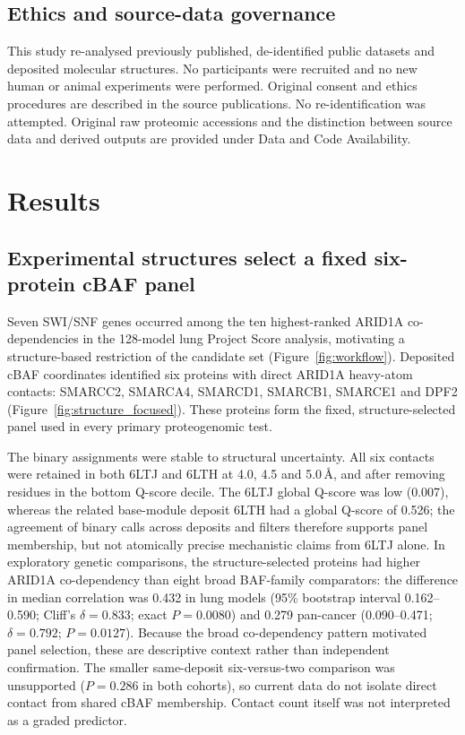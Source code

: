 \documentclass[journal=jprobs,manuscript=article,layout=traditional]{achemso}
\begin{document}
\subsection{Ethics and source-data governance}
This study re-analysed previously published, de-identified public datasets and deposited molecular structures. No participants were recruited and no new human or animal experiments were performed. Original consent and ethics procedures are described in the source publications. No re-identification was attempted. Original raw proteomic accessions and the distinction between source data and derived outputs are provided under Data and Code Availability.

\section{Results}

\subsection{Experimental structures select a fixed six-protein cBAF panel}

Seven SWI/SNF genes occurred among the ten highest-ranked ARID1A co-dependencies in the 128-model lung Project Score analysis, motivating a structure-based restriction of the candidate set (Figure~\ref{fig:workflow}). Deposited cBAF coordinates identified six proteins with direct ARID1A heavy-atom contacts: SMARCC2, SMARCA4, SMARCD1, SMARCB1, SMARCE1 and DPF2 (Figure~\ref{fig:structure_focused}). These proteins form the fixed, structure-selected panel used in every primary proteogenomic test.

The binary assignments were stable to structural uncertainty. All six contacts were retained in both 6LTJ and 6LTH at 4.0, 4.5 and 5.0\,\AA{}, and after removing residues in the bottom Q-score decile. The 6LTJ global Q-score was low (0.007), whereas the related base-module deposit 6LTH had a global Q-score of 0.526; the agreement of binary calls across deposits and filters therefore supports panel membership, but not atomically precise mechanistic claims from 6LTJ alone. In exploratory genetic comparisons, the structure-selected proteins had higher ARID1A co-dependency than eight broad BAF-family comparators: the difference in median correlation was 0.432 in lung models (95\% bootstrap interval 0.162--0.590; Cliff's $\delta=0.833$; exact $P=0.0080$) and 0.279 pan-cancer (0.090--0.471; $\delta=0.792$; $P=0.0127$). Because the broad co-dependency pattern motivated panel selection, these are descriptive context rather than independent confirmation. The smaller same-deposit six-versus-two comparison was unsupported ($P=0.286$ in both cohorts), so current data do not isolate direct contact from shared cBAF membership. Contact count itself was not interpreted as a graded predictor.
\end{document}
